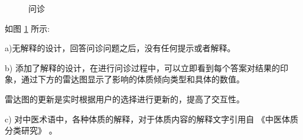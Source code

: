 \begin{figure}
    \caption{问诊}
    \label{fig:questions}
\end{figure}

如图 \ref{fig:questions} 所示:

a)无解释的设计，回答问诊问题之后，没有任何提示或者解释。

b) 添加了解释的设计，在进行问诊过程中，可以立即看到每个答案对结果的印象，通过下方的雷达图显示了影响的体质倾向类型和具体的数值。

雷达图的更新是实时根据用户的选择进行更新的，提高了交互性。

c) 对中医术语中，各种体质的解释，对于体质内容的解释文字引用自 《中医体质分类研究》\cite{王琦20099} 。



